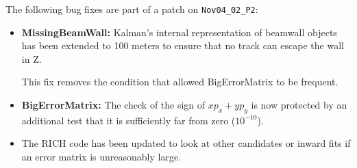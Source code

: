 
\begin{slide*}

\slideframe{}
\huge
{}
\Large

\begin{minipage}[t]{\linewidth}

\vspace{1cm}

The following bug fixes are part of a patch on {\tt Nov04\_02\_P2}:

\vspace{0.5cm}

\begin{itemize}

\item {\bf MissingBeamWall:} Kalman's internal representation of
beamwall objects has been extended to 100 meters to ensure that no
track can escape the wall in Z.

\vspace{0.5cm}

This fix removes the condition that allowed BigErrorMatrix to be
frequent.

\vspace{1cm}

\item {\bf BigErrorMatrix:} The check of the sign of $x p_x + y p_y$
is now protected by an additional test that it is sufficiently far
from zero ($10^{-10}$).

\vspace{1cm}

\item The RICH code has been updated to look at other candidates or
  inward fits if an error matrix is unreasonably large.

\end{itemize}

\end{minipage}

\end{slide*}


